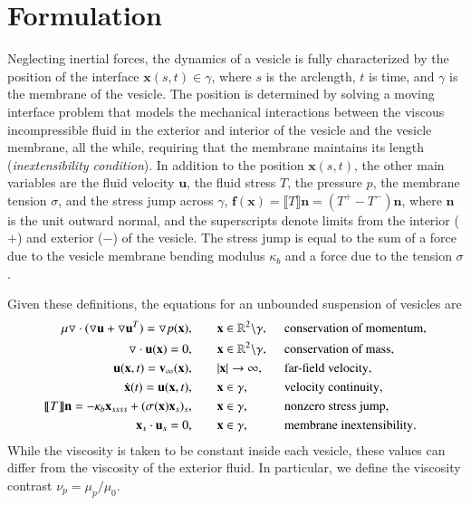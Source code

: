 \documentclass[3p,times,procedia]{elsarticle}
\newcommand{\grad}{{\triangledown}}
\newcommand{\ff}{{\mathbf{f}}}
\newcommand{\uu}{{\mathbf{u}}}
\newcommand{\vv}{{\mathbf{v}}}
\newcommand{\xx}{{\mathbf{x}}}
\newcommand{\RR}{{\mathbb{R}}}
\def\gap{\hspace*{.2in}}
\begin{document}
\section {Formulation}
\label{s:Formulation}
Neglecting inertial forces, the dynamics of a vesicle is fully
characterized by the position of the interface $\xx(s,t) \in \gamma$,
where $s$ is the arclength, $t$ is time, and $\gamma$ is the membrane of
the vesicle.  The position is determined by solving a moving interface
problem that models the mechanical interactions between the viscous
incompressible fluid in the exterior and interior of the vesicle and the
vesicle membrane, all the while, requiring that the membrane maintains
its length ({\em inextensibility condition}).  In addition to the
position $\xx(s,t)$, the other main variables are the fluid velocity
$\uu$, the fluid stress $T$, the pressure $p$, the membrane tension
$\sigma$, and the stress jump across $\gamma$, $\ff(\xx) = \llbracket T
\rrbracket \mathbf{n} = (T^{+} - T^{-})\mathbf{n}$, where $\mathbf{n}$
is the unit outward normal, and the superscripts denote limits from the
interior ($+$) and exterior ($-$) of the vesicle.  The stress jump is
equal to the sum of a force due to the vesicle membrane bending modulus
$\kappa_{b}$ and a force due to the tension $\sigma$.

Given these definitions, the equations for an unbounded suspension of
vesicles are
\begin{align}
\label{e:vesicles-pde}
  \begin{alignedat}{2}
    \mu \grad \cdot (\grad \uu + \grad \uu^{T}) = \grad p(\xx), 
    &\hspace{20pt} \xx \in \RR^{2}\backslash\gamma, 
      \gap &&  \mbox{conservation of momentum}, \\
    \grad \cdot \uu(\xx) = 0, &\hspace{20pt} 
    \xx \in \RR^{2} \backslash \gamma, 
      \gap &&\mbox{conservation of mass}, \\
    \uu(\xx,t) = \vv_{\infty}(\xx), &\hspace{20pt} |\xx| 
      \rightarrow \infty, 
       \gap  &&\mbox{far-field velocity}, \\
    \dot{\xx}(t) = \uu(\xx,t), &\hspace{20pt} \xx \in \gamma,
      \gap   &&\mbox{velocity continuity},\\
    \llbracket T \rrbracket \mathbf{n} = -\kappa_{b}\xx_{ssss} 
    + (\sigma(\xx) \xx_{s})_{s}, &\hspace{20pt} \xx \in \gamma,
      \gap  &&\mbox{nonzero stress jump}, \\
    \xx_{s} \cdot \uu_{s} = 0, &\hspace{20pt} \xx \in \gamma,
      \gap &&\mbox{membrane inextensibility}. \\
  \end{alignedat}
\end{align}
While the viscosity is taken to be constant inside each vesicle, these
values can differ from the viscosity of the exterior fluid.  In
particular, we define the viscosity contrast $\nu_{p} =
\mu_{p}/\mu_{0}$.
\end{document}
